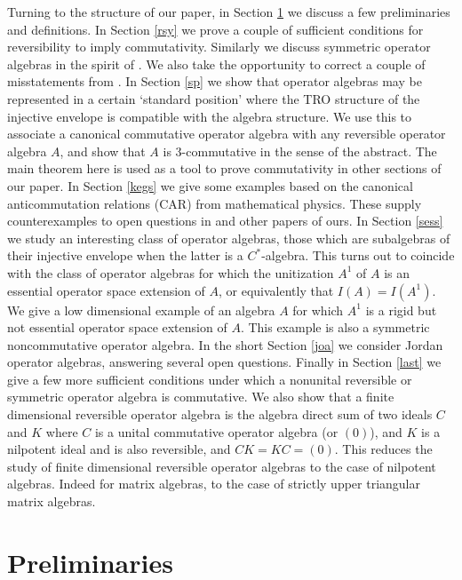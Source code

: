 \documentclass{amsart}
\theoremstyle{remark}
\theoremstyle{definition}
\numberwithin{equation}{section}
\begin{document}
 Turning to the structure of our paper, in Section
        \ref{prel} we discuss a few preliminaries and definitions.  In Section
        \ref{rsy} we prove a couple of  
        sufficient conditions for reversibility to imply commutativity.  Similarly we discuss symmetric operator algebras in the spirit of \cite[Section 2]{BWinv}.
        We also take the opportunity to correct a couple of misstatements from \cite{BWinv}. In Section
        \ref{sp} we show that operator algebras may be represented in a  certain `standard position' where the TRO structure of the injective envelope is compatible with the algebra structure.  We use this to associate a canonical commutative operator algebra with any reversible operator algebra $A$, and show that $A$ is 3-commutative in the sense of the abstract.  The main theorem here is used as a tool to prove commutativity in other sections of our paper.  In Section
        \ref{kegs} we give some examples based on the canonical anticommutation relations (CAR) from mathematical physics.  
        These supply counterexamples to open questions in \cite{BComm} and other papers of ours.  In Section
        \ref{sess} we study an interesting class of operator algebras,
        those which are subalgebras of their injective envelope when the latter is a $C^*$-algebra.  This turns out to coincide with the class of operator algebras for which the unitization $A^1$  of $A$  is an essential operator space extension of $A$, or equivalently that $I(A) = I(A^1)$.  We give a low dimensional example of 
        an algebra $A$ for which  $A^1$ is  a rigid  but not essential operator space extension of $A$. 
        This example is also a symmetric noncommutative operator algebra. 
        In the short Section 
    \ref{joa} we consider Jordan operator algebras, answering  several open questions. 
        Finally in Section
        \ref{last} we give a few more  
        sufficient conditions under which a nonunital reversible or symmetric  operator algebra is commutative.  
        We also show that a  finite dimensional 
     reversible  operator  algebra is the algebra direct sum of two ideals $C$ and $K$ where $C$ is a unital commutative operator  algebra (or $(0)$), and $K$ is a  nilpotent ideal and is also reversible, 
     and $CK = KC = (0)$.  This reduces the study of finite dimensional 
     reversible  operator  algebras to the case of nilpotent algebras.  Indeed for matrix algebras,
     to the case of strictly upper triangular matrix algebras.
     
 \section{Preliminaries} \label{prel} 
 
\end{document}
